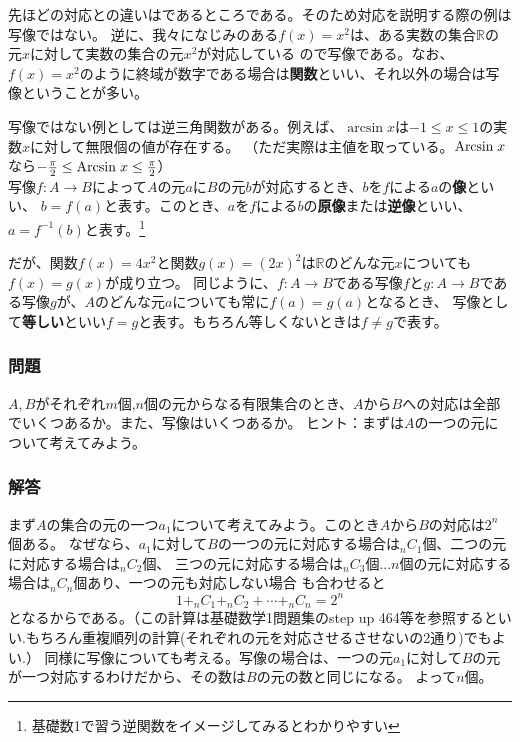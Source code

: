 \documentclass[a4j,dvipdfmx]{jsarticle}
\begin{document}
先ほどの対応との違いはであるところである。そのため対応を説明する際の例は写像ではない。
逆に、我々になじみのある$f(x)=x^2$は、ある実数の集合$\mathbb{R}$の元$x$に対して実数の集合の元$x^2$が対応している
ので写像である。なお、$f(x)=x^2$のように終域が数字である場合は\textbf{関数}といい、それ以外の場合は写像ということが多い。

写像ではない例としては逆三角関数がある。例えば、$\arcsin x$は$-1\leq x\leq 1$の実数$x$に対して無限個の値が存在する。
（ただ実際は主値を取っている。$\mathrm{Arcsin}\hspace{1mm}x$なら$-\frac{\pi}{2}\leq \mathrm{Arcsin}\hspace{1mm}x\leq \frac{\pi}{2}$）\\

写像$f:A\to B$によって$A$の元$a$に$B$の元$b$が対応するとき、$b$を$f$による$a$の\textbf{像}といい、
$b=f(a)$と表す。このとき、$a$を$f$による$b$の\textbf{原像}または\textbf{逆像}といい、$a=f^{-1}(b)$と表す。\footnote{基礎数1で習う逆関数をイメージしてみるとわかりやすい}

だが、関数$f(x)=4x^2$と関数$g(x)=(2x)^2$は$\mathbb{R}$のどんな元$x$についても$f(x)=g(x)$が成り立つ。
同じように、$f:A\to B$である写像$f$と$g:A\to B$である写像$g$が、$A$のどんな元$a$についても常に$f(a)=g(a)$となるとき、
写像として\textbf{等しい}といい$f=g$と表す。もちろん等しくないときは$f\neq g$で表す。

\subsubsection*{問題}
$A,B$がそれぞれ$m$個,$n$個の元からなる有限集合のとき、$A$から$B$への対応は全部でいくつあるか。また、写像はいくつあるか。
{\scriptsize ヒント：まずは$A$の一つの元について考えてみよう。}
\vspace{60mm}
\subsubsection*{解答}
\color{red}
まず$A$の集合の元の一つ$a_1$について考えてみよう。このとき$A$から$B$の対応は$2^n$個ある。
なぜなら、$a_1$に対して$B$の一つの元に対応する場合は$_nC_1$個、二つの元に対応する場合は$_nC_2$個、
三つの元に対応する場合は$_nC_3$個...$n$個の元に対応する場合は$_nC_n$個あり、一つの元も対応しない場合
も合わせると
\begin{equation*}
    1+_nC_1+_nC_2+\cdots+_nC_n=2^n
\end{equation*}
となるからである。（この計算は基礎数学1問題集のstep up 464等を参照するといい.もちろん重複順列の計算(それぞれの元を対応させるさせないの2通り)でもよい.）
同様に写像についても考える。写像の場合は、一つの元$a_1$に対して$B$の元が一つ対応するわけだから、その数は$B$の元の数と同じになる。
よって$n$個。
\end{document}
